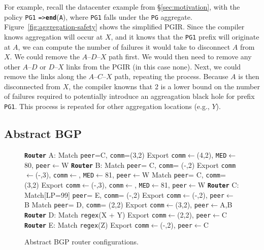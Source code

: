 \documentclass[10pt]{sigalternate052015}
\newcommand{\CD}[1]{\texttt{\small #1}}  %
\newcommand{\KW}[1]{\texttt{\small\bfseries{#1}}}
\newcommand{\Path}{\texttt{=>}}
\newcommand{\End}{\KW{end}}
\begin{document}
For example, recall the datacenter example from \S\ref{sec:motivation}, with the policy
\CD{PG1} \Path \text{ }\End(\CD{A}), where \CD{PG1} falls under the \CD{PG} aggregate. Figure~\ref{fig:aggregation-safety} shows the simplified PGIR. Since the compiler knows aggregation will occur at $X$, and it knows that the \CD{PG1} prefix will originate at $A$, we can compute the number of failures it would take to disconnect $A$ from $X$. We could remove the $A$--$D$--$X$ path first. We would then need to remove any other $A$--$D$ or $D$--$X$ links from the PGIR (in this case none). Next, we could remove the links along the $A$--$C$--$X$ path, repeating the process. Because $A$ is then disconnected from $X$, the compiler knowns that 2 is a lower bound on the number of failures required to potentially introduce an aggreagation black hole for prefix \CD{PG1}. This process is repeated for other aggregation locations (e.g., $Y$).


\subsection{Abstract BGP}
\label{sec:abgp}



\newcommand{\highlight}[1]{%
  \colorbox{red!50}{$\displaystyle#1$}}
\newcommand{\Router}[1]{\KW{Router} #1:}
\newcommand{\REGEX}[1]{\texttt{regex}(#1)}
\newcommand{\PEER}{\texttt{peer}}
\newcommand{\COMM}{\texttt{comm}}
\newcommand{\MED}{\texttt{MED}}
\newcommand{\Arrow}{\ensuremath{\leftarrow}}

\begin{figure}[t!]
\begin{code}
  \Router{A}
    Match \PEER=C, \COMM=(3,2)
      Export \COMM \Arrow (4,2),
             \MED \Arrow 80, \PEER \Arrow W
  \Router{B}
    Match \PEER = C, \COMM = (-,2)
      Export \COMM \Arrow (-,3), \COMM \Arrow {},
             \MED \Arrow 81, \PEER \Arrow W
    Match \PEER = C, \COMM = (3,2)
      Export \COMM \Arrow (-,3), \COMM \Arrow {},
             \MED \Arrow 81, \PEER \Arrow W
  \Router{C}
    Match[LP=99] \PEER = E, \COMM = (-,2)
      Export \COMM \Arrow (-,2), \PEER \Arrow B
    Match \PEER = D, \COMM = (2,2)
      Export \COMM \Arrow (3,2), \PEER \Arrow A,B
  \Router{D}
    Match \REGEX{X + Y}
      Export \COMM \Arrow (2,2), \PEER \Arrow C
  \Router{E}
    Match \REGEX{Z}
      Export \COMM \Arrow (-,2), \PEER \Arrow C
  \end{code}
  \vspace{-2em}
  \caption{Abstract BGP router configurations. \label{fig:abgp-config}}
  \vspace{-1em}
\end{figure}
\end{document}

